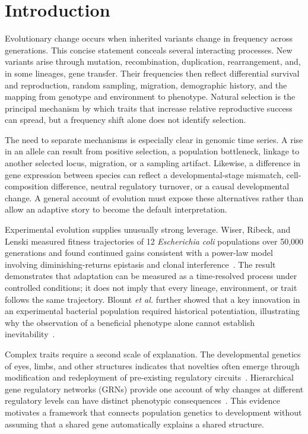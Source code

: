 \documentclass[conference]{IEEEtran}
\begin{document}
\section{Introduction}

Evolutionary change occurs when inherited variants change in frequency across generations. This concise statement conceals several interacting processes. New variants arise through mutation, recombination, duplication, rearrangement, and, in some lineages, gene transfer. Their frequencies then reflect differential survival and reproduction, random sampling, migration, demographic history, and the mapping from genotype and environment to phenotype. Natural selection is the principal mechanism by which traits that increase relative reproductive success can spread, but a frequency shift alone does not identify selection.

The need to separate mechanisms is especially clear in genomic time series. A rise in an allele can result from positive selection, a population bottleneck, linkage to another selected locus, migration, or a sampling artifact. Likewise, a difference in gene expression between species can reflect a developmental-stage mismatch, cell-composition difference, neutral regulatory turnover, or a causal developmental change. A general account of evolution must expose these alternatives rather than allow an adaptive story to become the default interpretation.

Experimental evolution supplies unusually strong leverage. Wiser, Ribeck, and Lenski measured fitness trajectories of 12 \emph{Escherichia coli} populations over 50,000 generations and found continued gains consistent with a power-law model involving diminishing-returns epistasis and clonal interference~\cite{wiser2013}. The result demonstrates that adaptation can be measured as a time-resolved process under controlled conditions; it does not imply that every lineage, environment, or trait follows the same trajectory. Blount \emph{et al.} further showed that a key innovation in an experimental bacterial population required historical potentiation, illustrating why the observation of a beneficial phenotype alone cannot establish inevitability~\cite{blount2008}.

Complex traits require a second scale of explanation. The developmental genetics of eyes, limbs, and other structures indicates that novelties often emerge through modification and redeployment of pre-existing regulatory circuits~\cite{shubin2009}. Hierarchical gene regulatory networks (GRNs) provide one account of why changes at different regulatory levels can have distinct phenotypic consequences~\cite{erwindavidson2009}. This evidence motivates a framework that connects population genetics to development without assuming that a shared gene automatically explains a shared structure.
\end{document}
